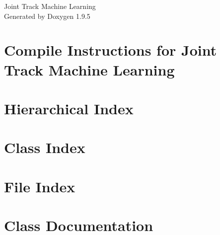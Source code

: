 \documentclass[twoside]{book}
\newcommand{\+}{\discretionary{\mbox{\scriptsize$\hookleftarrow$}}{}{}}
\newcommand{\clearemptydoublepage}{%
    \newpage{\pagestyle{empty}\cleardoublepage}%
  }
\begin{document}
  \raggedbottom
    \hypersetup{pageanchor=false,
                bookmarksnumbered=true,
                pdfencoding=unicode
               }
  \begin{titlepage}
  \vspace*{7cm}
  \begin{center}%
  {\Large Joint Track Machine Learning}\\
  \vspace*{1cm}
  {\large Generated by Doxygen 1.9.5}\\
  \end{center}
  \end{titlepage}
  \clearemptydoublepage
  \tableofcontents
  \clearemptydoublepage
  \hypersetup{pageanchor=true}
\chapter{Compile Instructions for Joint Track Machine Learning}
\label{md_compile_instructions}

\chapter{Hierarchical Index}

\chapter{Class Index}

\chapter{File Index}

\chapter{Class Documentation}




































\end{document}
